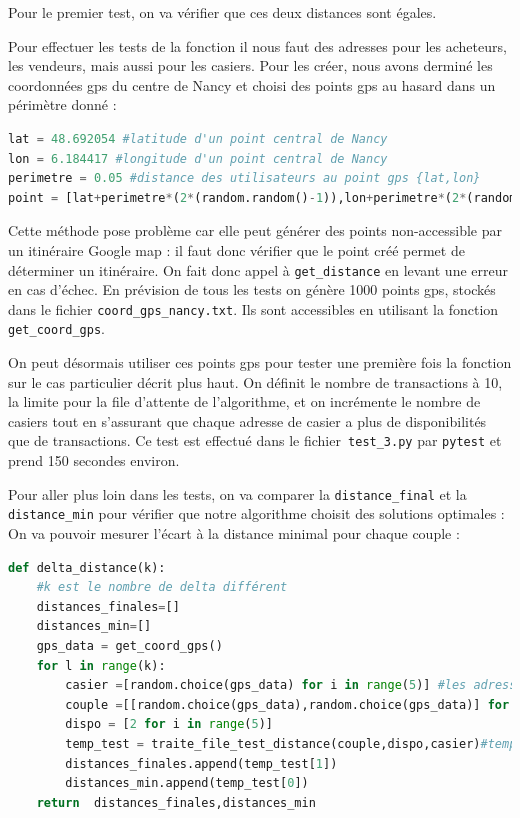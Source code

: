 \documentclass[11pt]{article}
\begin{document}
Pour le premier test, on va vérifier que ces deux distances sont égales.
\vspace{0.4cm}

Pour effectuer les tests de la fonction il nous faut des adresses pour les acheteurs, les vendeurs, mais aussi pour les casiers. Pour les créer, nous avons derminé les coordonnées gps du centre de Nancy et choisi des points gps au hasard dans un périmètre donné :

\begin{lstlisting}[language=Python, caption={création de points gps autour du centre de Nancy }]
lat = 48.692054 #latitude d'un point central de Nancy
lon = 6.184417 #longitude d'un point central de Nancy
perimetre = 0.05 #distance des utilisateurs au point gps {lat,lon} 
point = [lat+perimetre*(2*(random.random()-1)),lon+perimetre*(2*(random.random()-1))]
\end{lstlisting}

Cette méthode pose problème car elle peut générer des points non-accessible par un itinéraire Google map : il faut donc vérifier que le point créé permet de déterminer un itinéraire. On fait donc appel à \texttt{get\_distance} en levant une erreur en cas d'échec. En prévision de tous les tests on génère 1000 points gps, stockés dans le fichier \texttt{coord\_gps\_nancy.txt}. Ils sont accessibles en utilisant la fonction \texttt{get\_coord\_gps}.
\vspace{0.4cm}

On peut désormais utiliser ces points gps pour tester une première fois la fonction sur le cas particulier décrit plus haut. On définit le nombre de transactions à 10, la limite pour la file d'attente de l'algorithme, et on incrémente le nombre de casiers tout en s'assurant que chaque adresse de casier a plus de disponibilités que de transactions.
Ce test est effectué dans le fichier\texttt{ test\_3.py} par \texttt{pytest} et prend 150 secondes environ.
\vspace{0.4cm}

Pour aller plus loin dans les tests, on va comparer la \texttt{distance\_final} et la \texttt{distance\_min} pour vérifier que notre algorithme choisit des solutions optimales :
On va pouvoir mesurer l'écart à la distance minimal pour chaque couple :


\begin{lstlisting}[language=Python, caption={\texttt{test\_4.py} permet de générer les courbes de \texttt{distance\_final} et \texttt{distance\_min} }]
def delta_distance(k):
    #k est le nombre de delta différent
    distances_finales=[]
    distances_min=[]
    gps_data = get_coord_gps()
    for l in range(k):
        casier =[random.choice(gps_data) for i in range(5)] #les adresses des casiers
        couple =[[random.choice(gps_data),random.choice(gps_data)] for i in range(10)] #un couple = une transacton acheteur vendeur, 10 transactions
        dispo = [2 for i in range(5)]
        temp_test = traite_file_test_distance(couple,dispo,casier)#temp test corr
        distances_finales.append(temp_test[1])
        distances_min.append(temp_test[0])
    return  distances_finales,distances_min
\end{lstlisting}
\end{document}
